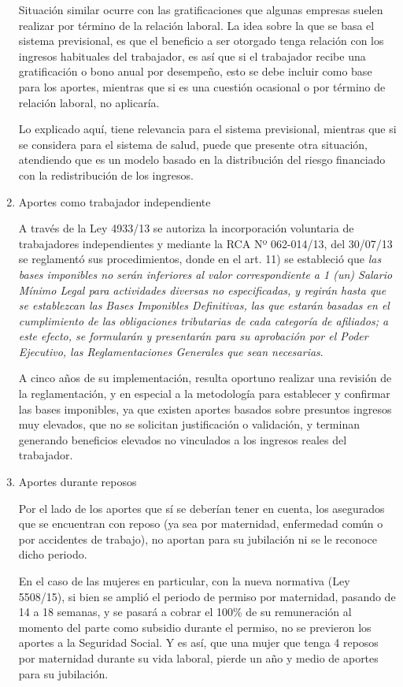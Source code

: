 \documentclass[a4paper,11pt]{article}
\begin{document}
\begin{enumerate}
Situación similar ocurre con las gratificaciones que algunas empresas suelen realizar por término de la relación laboral.  La idea sobre la que se basa el sistema previsional, es que el beneficio a ser otorgado tenga relación con los ingresos habituales del trabajador, es así que si el trabajador recibe una gratificación o bono anual por desempeño, esto se debe incluir como base para los aportes, mientras que si es una cuestión ocasional o por término de relación laboral, no aplicaría.

Lo explicado aquí, tiene relevancia para el sistema previsional, mientras que si se considera para el sistema de salud, puede que presente otra situación, atendiendo que es un modelo basado en la distribución del riesgo financiado con la redistribución de los ingresos.

\item Aportes como trabajador independiente

A través de la Ley 4933/13 se autoriza la incorporación voluntaria de trabajadores independientes y mediante la RCA Nº 062-014/13, del 30/07/13 se reglamentó sus procedimientos, donde en el art. 11) se estableció que \textit{las bases imponibles no serán inferiores al valor correspondiente a  1 (un) Salario Mínimo Legal para actividades diversas no especificadas, y regirán hasta que se establezcan las Bases Imponibles Definitivas, las que estarán basadas en el cumplimiento de las obligaciones tributarias de cada categoría de afiliados; a este efecto, se formularán y presentarán para su aprobación por el Poder Ejecutivo, las Reglamentaciones Generales que sean necesarias}.

A cinco años de su implementación, resulta oportuno realizar una revisión de la reglamentación, y en especial a la metodología para establecer y confirmar las bases imponibles, ya que existen aportes basados sobre presuntos ingresos muy elevados, que no se solicitan justificación o validación, y terminan generando beneficios elevados no vinculados a los ingresos reales del trabajador.

\item Aportes durante reposos

Por el lado de los aportes que sí se deberían tener en cuenta, los asegurados que se encuentran con reposo (ya sea por maternidad, enfermedad común o por accidentes de trabajo), no aportan para su jubilación ni se le reconoce dicho periodo.  

En el caso de las mujeres en particular, con la nueva normativa (Ley 5508/15), si bien se amplió el periodo de permiso por maternidad, pasando de 14 a 18 semanas, y se pasará a cobrar el 100\% de su remuneración al momento del parte como subsidio durante el permiso, no se previeron los aportes a la Seguridad Social.  Y es así, que una mujer que tenga 4 reposos por maternidad durante su vida laboral, pierde un año y medio de aportes para su jubilación.


\end{enumerate}
\end{document}
